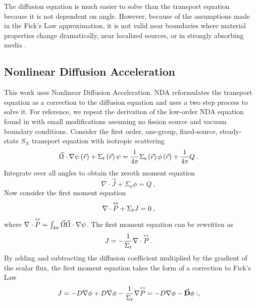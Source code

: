 The diffusion equation is much easier to solve than the transport equation because it is not dependent on angle. However, because of the assumptions made in the Fick's Law approximation, it is not valid near boundaries where material properties change dramatically, near localized sources, or in strongly absorbing media \cite{lewis-miller}.

\subsection{Nonlinear Diffusion Acceleration}
This work uses Nonlinear Diffusion Acceleration. NDA reformulates the transport equation as a correction to the diffusion equation and uses a two step process to solve it. For reference, we repeat the derivation of the low-order NDA equation found in \cite{morel-holo} with small modifications assuming no fission source and vacuum boundary conditions. Consider the first order, one-group, fixed-source, steady-state $S_N$ transport equation with isotropic scattering
%
  \begin{equation}
  \vec{\Omega}\cdot \nabla \psi \left(\vec{r}\right)+ \Sigma_{\mathrm{t}}\left(\vec{r}\right)\psi = \frac{1}{4 \pi} \Sigma_{\mathrm{s}}\left(\vec{r}\right) \phi\left(\vec{r}\right) + \frac{1}{4 \pi} Q\:.
  \end{equation}
Integrate over all angles to obtain the zeroth moment equation
\begin{equation}
  \nabla \cdot \vec{J} + \Sigma_a\phi  =  Q\:,
  \label{eq:zeroth_moment_1g}
  \end{equation}
Now consider the first moment equation
  \begin{equation}
  \nabla \cdot \overset{\text{\scriptsize$\leftrightarrow$}}{P} + \Sigma_t J = 0 \:,
  \end{equation}
where $\nabla \cdot \overset{\text{\scriptsize$\leftrightarrow$}}{P} =  \int_{4\pi} \vec{\Omega} \vec{\Omega} \cdot \nabla \psi$. The first moment equation can be rewritten as
%
  \begin{equation}
  J= -\frac{1}{\Sigma_t} \nabla \cdot \overset{\text{\scriptsize$\leftrightarrow$}}{P}\:. 
  \end{equation}
  By adding and subtracting the diffusion coefficient multiplied by the gradient of the scalar flux, the first moment equation takes the form of a correction to Fick's Law
  \begin{equation}
  J = -D \nabla \phi + D \nabla \phi - \frac{1}{\Sigma_t} \nabla \overset{\text{\scriptsize$\leftrightarrow$}}{P} \\
  = -D \nabla \phi - \vec{\textbf{D}} \phi:,
  \label{eq:fick_corr_1g}
  \end{equation}
